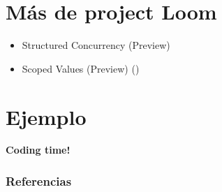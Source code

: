 \documentclass{presentacion}
\begin{document}
\section{Más de project Loom}
\begin{frame}
    \begin{itemize}
        \item Structured Concurrency (Preview) 
        \item Scoped Values (Preview)  \hspace{1em}()
    \end{itemize}

\end{frame}

\section{Ejemplo}
\begin{frame}
    \centering
    \textbf{\Huge{Coding time!} }
\end{frame}



\begin{frame}[t, allowframebreaks]
\frametitle{Referencias}
\printbibliography
\end{frame}
\end{document}

